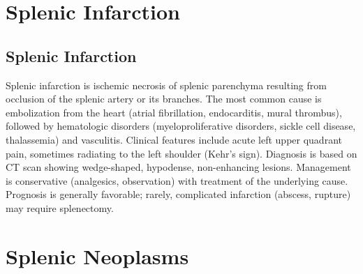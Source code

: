 \section{Splenic Infarction}








\label{sec:section:Splenic Infarction}

\subsection{Splenic Infarction}
\label{sec:Splenic Infarction}
Splenic infarction is ischemic necrosis of splenic parenchyma resulting from occlusion of the splenic artery or its branches. The most common cause is embolization from the heart (atrial fibrillation, endocarditis, mural thrombus), followed by hematologic disorders (myeloproliferative disorders, sickle cell disease, thalassemia) and vasculitis. Clinical features include acute left upper quadrant pain, sometimes radiating to the left shoulder (Kehr's sign). Diagnosis is based on CT scan showing wedge-shaped, hypodense, non-enhancing lesions. Management is conservative (analgesics, observation) with treatment of the underlying cause. Prognosis is generally favorable; rarely, complicated infarction (abscess, rupture) may require splenectomy.

\section{Splenic Neoplasms}

